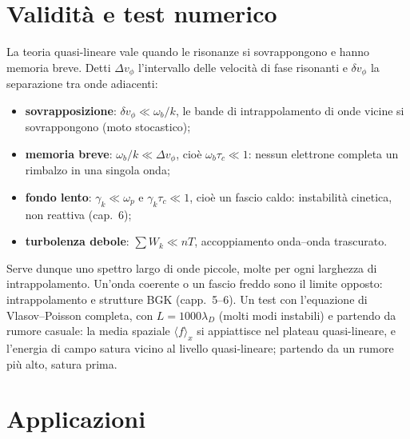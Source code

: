 \section{Validità e test numerico}
La teoria quasi-lineare vale quando le risonanze si sovrappongono e hanno memoria breve. Detti $\Delta v_\phi$ l'intervallo delle velocità di fase risonanti e $\delta v_\phi$ la separazione tra onde adiacenti:
\begin{itemize}
\item \textbf{sovrapposizione}: $\delta v_\phi\ll\omega_b/k$, le bande di intrappolamento di onde vicine si sovrappongono (moto stocastico);
\item \textbf{memoria breve}: $\omega_b/k\ll\Delta v_\phi$, cioè $\omega_b\tau_c\ll1$: nessun elettrone completa un rimbalzo in una singola onda;
\item \textbf{fondo lento}: $\gamma_k\ll\omega_p$ e $\gamma_k\tau_c\ll1$, cioè un fascio caldo: instabilità cinetica, non reattiva (cap.~6);
\item \textbf{turbolenza debole}: $\sum W_k\ll nT$, accoppiamento onda--onda trascurato.
\end{itemize}
Serve dunque uno spettro largo di onde piccole, molte per ogni larghezza di intrappolamento. Un'onda coerente o un fascio freddo sono il limite opposto: intrappolamento e strutture BGK (capp.~5--6).
Un test con l'equazione di Vlasov--Poisson completa, con $L=1000\lambda_D$ (molti modi instabili) e partendo da rumore casuale: la media spaziale $\langle f\rangle_x$ si appiattisce nel plateau quasi-lineare, e l'energia di campo satura vicino al livello quasi-lineare; partendo da un rumore più alto, satura prima.

\section{Applicazioni}

